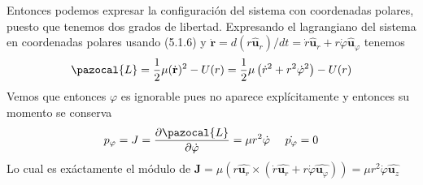 Entonces podemos expresar la configuración del sistema con coordenadas polares, puesto que tenemos dos grados de libertad. Expresando el lagrangiano del sistema en coordenadas polares usando (5.1.6) y $\dot{\mathbf{r}}=d{(r \hat{\mathbf{u}}_r)}/dt=\dot{r}\hat{\mathbf{u}}_r + r \dot{\varphi}\hat{\mathbf{u}}_\varphi$ tenemos
\begin{equation} \label{5.1.15}
    \pazocal{L} = \frac{1}{2}\mu(\dot{\mathbf{r}})^2-U(r) = \frac{1}{2}\mu\left(\dot{r}^2+r^2\dot{\varphi}^2\right)-U(r)
\end{equation} 
Vemos que entonces $\varphi$ es ignorable pues no aparece explícitamente y entonces su momento se conserva
\begin{equation} \label{5.1.16}
    p_\varphi = J = \frac{\partial \pazocal{L}}{\partial \dot{\varphi}} = \mu r^2 \dot{\varphi} \ \ \ \  \dot{p_\varphi} = 0
\end{equation} 
Lo cual es exáctamente el módulo de $\mathbf{J}=\mu (r\hat{\mathbf{u}_r}\times (\dot{r}\hat{\mathbf{u}_r} + r \dot{\varphi} \hat{\mathbf{u}_\varphi}))= \mu r^2 \dot{\varphi}\hat{\mathbf{u}_z}$
\vspace{5pt}
